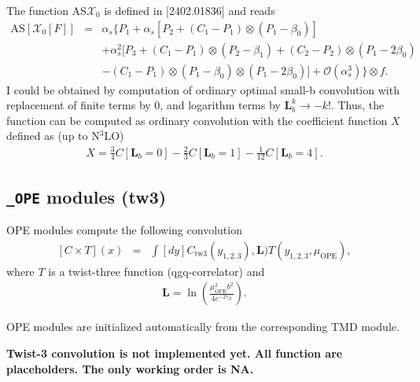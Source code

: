 \documentclass[prd,nofootinbib,eqsecnum,final]{revtex4}
\newcommand{\nn}{\nonumber}
\renewcommand{\(}{\left(}
\renewcommand{\)}{\right)}
\renewcommand{\[}{\left[}
\renewcommand{\]}{\right]}
\newcommand{\red}[1]{{\color[rgb]{1,0,0} #1}}
\begin{document}
The function AS$\mathcal{X}_0$ is defined in [2402.01836] and reads
\begin{eqnarray}\label{def:AS_X0}
\text{AS}[\mathcal{X}_0[F]]&=&\alpha_s \Big\{P_1+\alpha_s\[P_2+\(C_1-P_1\)\otimes\(P_1-\beta_0\)\]
\\\nn &&+\alpha_s^2\Big[P_3+\(C_1-P_1\)\otimes\(P_2-\beta_1\)
+\(C_2-P_2\)\otimes\(P_1-2\beta_0\)
\\\nn &&-\(C_1-P_1\)\otimes\(P_1-\beta_0\)\otimes\(P_1-2\beta_0\)\Big]
+\mathcal{O}\(\alpha_s^3\)\Big\}\otimes f.
\end{eqnarray}
I could be obtained by computation of ordinary optimal small-b convolution with replacement of finite terms by $0$, and logarithm terms by $\mathbf{L}_b^k\to -k!$. Thus, the function can be computed as ordinary convolution with the coefficient function $X$ defined as (up to N$^3$LO)
\begin{eqnarray}
X=\frac{3}{4}C[\mathbf{L}_b=0]-\frac{2}{3}C[\mathbf{L}_b=1]-\frac{1}{12}C[\mathbf{L}_b=4].
\end{eqnarray}



\subsection{\texttt{\_OPE} modules (tw3)}
\label{TMD_OPE_tw3}

OPE modules compute the following convolution
\begin{eqnarray}\label{OPE:tw3:main}
[C\times T](x)&=&\int [dy] C_{\text{tw3}}(y_{1,2,3}),\mathbf{L})T\(y_{1,2,3},\mu_{\text{OPE}}\),
\end{eqnarray}
where $T$ is a twist-three function (qgq-correlator) and
\begin{eqnarray}
\mathbf{L}=\ln\(\frac{\mu^2_{\text{OPE}}b^2}{4e^{-2\gamma_E}}\).
\end{eqnarray}

\begin{tcolorbox}
\begin{center}
OPE modules are initialized automatically from the corresponding TMD module.
\end{center}
\end{tcolorbox}

\begin{tcolorbox}
\begin{center}
\red{
\textbf{Twist-3 convolution is not implemented yet. All function are placeholders. The only working order is NA.}}
\end{center}
\end{tcolorbox}
\end{document}
